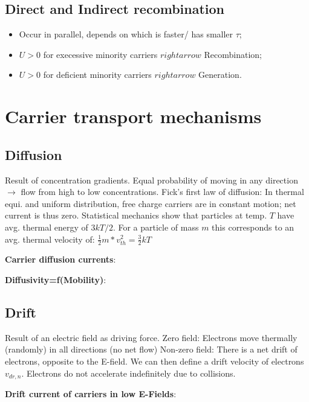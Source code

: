 \documentclass[a4paper, fontsize=8pt, landscape, DIV=1]{scrartcl}
\begin{document}
\begin{multicols*}{4}
\subsection{Direct and Indirect recombination}
\begin{itemize}[nolistsep,noitemsep]
	\item Occur in parallel, depends on which is faster/ has smaller $\tau$;
	\item $U>0$ for execessive minority carriers $rightarrow$ Recombination;
	\item $U>0$ for deficient minority carriers $rightarrow$ Generation.
\end{itemize}
\section{Carrier transport mechanisms}
\subsection{Diffusion}
Result of concentration gradients. Equal probability of moving in any direction $\rightarrow$ flow from high to low concentrations. Fick's first law of diffusion:
In thermal equi. and uniform distribution, free charge carriers are in constant motion; net current is thus zero. Statistical mechanics show that particles at temp. $T$ have avg. thermal energy of $3kT/2$. For a particle of mass $m$ this corresponds to an avg. thermal velocity of:
$\frac{1}{2}m*v_{th}^2=\frac{3}{2}kT$

\textbf{Carrier diffusion currents}:

\textbf{Diffusivity=f(Mobility)}:


\subsection{Drift}
Result of an electric field as driving force. Zero field: Electrons move thermally (randomly) in all directions (no net flow) Non-zero field: There is a net drift of electrons, opposite to the E-field. We can then define a drift velocity of electrons $v_{dr,n}$. Electrons do not accelerate indefinitely due to collisions.

\textbf{Drift current of carriers in low E-Fields}:


\end{multicols*}
\end{document}
